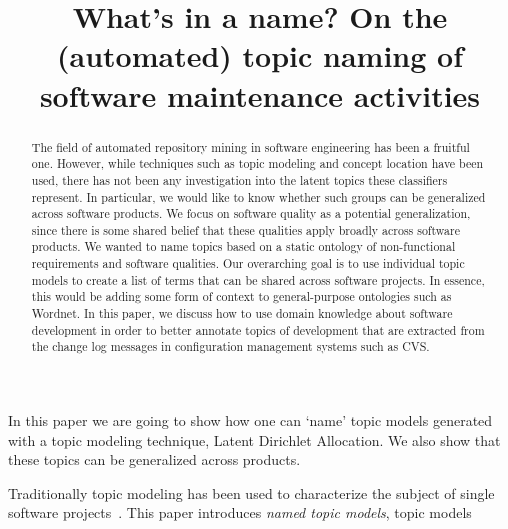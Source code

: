 \documentclass[10pt, conference, compsocconf]{IEEEtran}
\begin{document}
 
\author{
\and
{}
}


\title{What's in a name? On the (automated) topic naming of software maintenance activities}

\maketitle
\thispagestyle{empty}

\begin{abstract}
  The field of automated repository mining in software engineering has
  been a fruitful one. However, while techniques such as topic modeling and concept location have been used, there has not been any
  investigation into the latent topics these classifiers represent. In
  particular, we would like to know whether such groups can be
  generalized across software products. We focus on software quality
  as a potential generalization, since there is some shared belief
  that these qualities apply broadly across software products. We
  wanted to name topics based on a static ontology of non-functional
  requirements and software qualities. Our overarching goal is to use
  individual topic models to create a list of terms that can be shared
  across software projects. In essence, this would be adding some form
  of context to general-purpose ontologies such as Wordnet. In this
  paper, we discuss how to use domain knowledge about software
  development in order to better annotate topics of development that
  are extracted from the change log messages in configuration
  management systems such as CVS.
\end{abstract}



In this paper we are going to show how one can `name' topic models generated with a topic modeling technique, Latent Dirichlet Allocation. We also show that these topics can be generalized
across products.

Traditionally topic modeling has been used to characterize the subject of single software projects~\cite{}. This paper introduces \emph{named topic models}, topic models  
\end{document}
